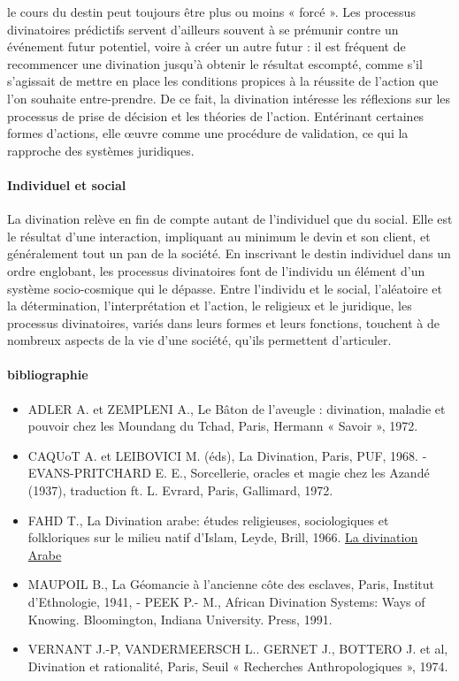  le cours du destin peut toujours être plus ou moins « forcé ». Les processus divinatoires prédictifs servent d'ailleurs souvent à se prémunir contre un événement futur potentiel, voire à créer un autre futur : il est fréquent de recommencer une divination jusqu'à obtenir le résultat escompté, comme s'il s'agissait de mettre en place les conditions propices à la réussite de l'action que l'on souhaite entre-prendre. De ce fait, la divination intéresse les réflexions sur les processus de prise de décision et les théories de l'action. Entérinant certaines formes d'actions, elle œuvre comme une procédure de validation, ce qui la rapproche des systèmes juridiques.
\paragraph{Individuel et social}
La divination relève en fin de compte autant de l'individuel que du social. Elle est le résultat d'une interaction, impliquant au minimum le devin et son client, et généralement tout un pan de la société. En inscrivant le destin individuel dans un ordre englobant, les processus divinatoires font de l'individu un élément d'un système socio-cosmique qui le dépasse. Entre l'individu et le social, l'aléatoire et la détermination, l'interprétation et l'action, le religieux et le juridique, les processus divinatoires, variés dans leurs formes et leurs fonctions, touchent à de nombreux aspects de la vie d'une société, qu'ils permettent d'articuler.

\paragraph{bibliographie}
\begin{itemize}
    \item ADLER A. et ZEMPLENI A., Le Bâton de l'aveugle : divination, maladie et pouvoir chez les Moundang du Tchad, Paris, Hermann « Savoir », 1972.   
    \item  CAQUoT A.
et LEIBOVICI M. (éds), La Divination, Paris, PUF,
1968. - EVANS-PRITCHARD E. E., Sorcellerie, oracles et magie chez les Azandé (1937), traduction ft. L.
 Evrard, Paris, Gallimard, 1972. 

  \item  FAHD T., La Divination arabe: études religieuses, sociologiques et folkloriques sur le milieu natif d'Islam, Leyde, Brill, 1966. \href{https://books.google.fr/books?id=ETsVAAAAIAAJ&lpg=PP1&hl=fr&pg=PA8#v=onepage&q&f=false}{La divination Arabe}
  \item  MAUPOIL B., La Géomancie à l'ancienne côte des esclaves, Paris, Institut d'Ethnologie, 1941, - PEEK P.-
M., African Divination Systems: Ways of Knowing.
Bloomington, Indiana University. Press, 1991.
  \item  VERNANT J.-P, VANDERMEERSCH L.. GERNET J., BOTTERO J. et al, Divination et rationalité, Paris, Seuil « Recherches Anthropologiques », 1974.
 
\end{itemize}

